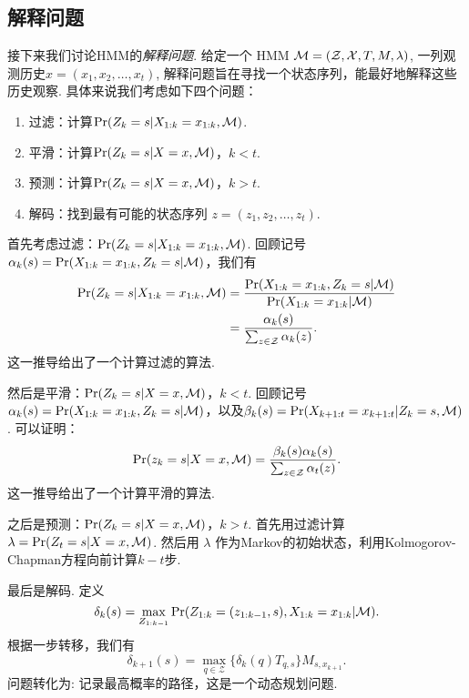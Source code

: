 \subsection{解释问题}
接下来我们讨论HMM的\emph{解释问题}. 给定一个 HMM $\mathcal M = (\mathcal Z, \mathcal X, T, M, \lambda)$, 一列观测历史$x = (x_1, x_2, \dots, x_t)$, 解释问题旨在寻找一个状态序列，能最好地解释这些历史观察. 具体来说我们考虑如下四个问题：
\begin{enumerate}
    \item 过滤：计算$\Pr(Z_k = s|X_{1:k}=x_{1:k}, \mathcal M)$.
    \item 平滑：计算$\Pr(Z_k = s|X=x, \mathcal M)$，$k < t$.
    \item 预测：计算$\Pr(Z_k = s|X=x, \mathcal M)$，$k > t$.
    \item 解码：找到最有可能的状态序列 $z = (z_1, z_2, \dots, z_t)$.
\end{enumerate}


首先考虑过滤：$\Pr(Z_k = s|X_{1:k}=x_{1:k}, \mathcal M)$. 回顾记号$\alpha_k(s)= \Pr(X_{1:k}=x_{1:k}, Z_k=s| \mathcal M)$，我们有
    \begin{align*}
        \Pr(Z_k = s|X_{1:k}=x_{1:k}, \mathcal M) & = \frac{\Pr(X_{1:k}=x_{1:k}, Z_k=s| \mathcal M)}{\Pr(X_{1:k}=x_{1:k}| \mathcal M)} \\
        &= \frac{\alpha_k(s)}{\sum_{z\in\mathcal Z}\alpha_k(z)}.
    \end{align*}
这一推导给出了一个计算过滤的算法.

然后是平滑：$\Pr(Z_k = s|X=x, \mathcal M)$，$k < t$.  回顾记号$\alpha_k(s)= \Pr(X_{1:k}=x_{1:k}, Z_k=s| \mathcal M)$，以及$\beta_k(s)=\Pr(X_{k+1:t}=x_{k+1:t} |Z_k=s, \mathcal M)$. 可以证明：
        \[\Pr(z_k = s|X=x, \mathcal M)=\frac{\beta_k(s)\alpha_k(s)}{\sum_{z\in\mathcal Z}\alpha_t(z)}.
    \]
这一推导给出了一个计算平滑的算法.


之后是预测：$\Pr(Z_k = s|X=x, \mathcal M)$，$k > t$. 首先用过滤计算 $\lambda=\Pr(Z_t = s|X=x, \mathcal M)$. 然后用 $\lambda$ 作为Markov的初始状态，利用Kolmogorov-Chapman方程向前计算$k-t$步.


最后是解码. 定义 
    $$\delta_k(s) = \max_{Z_{1:k-1}}\Pr(Z_{1:k} = (z_{1:k-1}, s), X_{1:k}=x_{1:k}| \mathcal M).$$
根据一步转移，我们有
    $$\delta_{k+1}(s) = \max_{q\in \mathcal Z}\{\delta_k(q)T_{q,s}\}M_{s,x_{k+1}}.$$
问题转化为: 记录最高概率的路径，这是一个动态规划问题.


